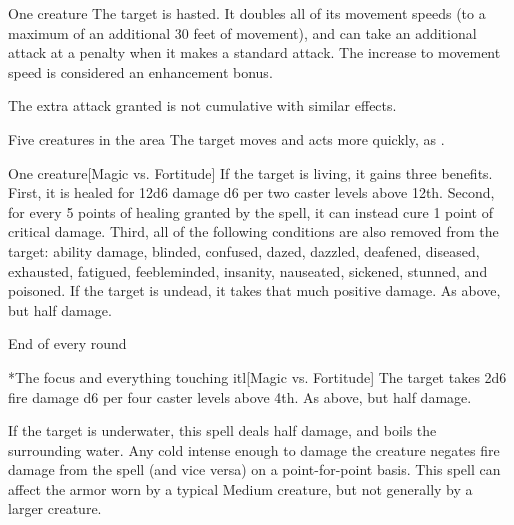 \spelldur{\durshort}
\begin{spelltarget}{One creature}
    \spelleffect The target is hasted. It doubles all of its movement speeds (to a maximum of an additional 30 feet of movement), and can take an additional attack at a  penalty when it makes a standard attack. The increase to movement speed is considered an enhancement bonus.
\end{spelltarget}
\spellnotes The extra attack granted is not cumulative with similar effects.

\begin{spelltargets}{Five creatures in the area}
    \spelleffect The target moves and acts more quickly, as .
\end{spelltargets}

\spellrng{\rngclose}
\begin{spelltarget}{One creature}[Magic vs. Fortitude]
    \spelleffect If the target is living, it gains three benefits. First, it is healed for 12d6 damage \add d6 per two caster levels above 12th. Second, for every 5 points of healing granted by the spell, it can instead cure 1 point of critical damage. Third, all of the following conditions are also removed from the target: ability damage, blinded, confused, dazed, dazzled, deafened, diseased, exhausted, fatigued, feebleminded, insanity, nauseated, sickened, stunned, and poisoned.
    \spellsuccess If the target is undead, it takes that much positive damage.
    \spellfailure As above, but half damage.
\end{spelltarget}

\spellrng{\rngmed}
\spelldur{\durshort \dismissable}
\begin{spelltrigger}{End of every round}
    \begin{spelltargets}*{The focus and everything touching it}l[Magic vs. Fortitude]
        \spellsuccess The target takes 2d6 fire damage \add d6 per four caster levels above 4th.
        \spellfailure As above, but half damage.
    \end{spelltargets}
\end{spelltrigger}
\spellnotes If the target is underwater, this spell deals half damage, and boils the surrounding water. Any cold intense enough to damage the creature negates fire damage from the spell (and vice versa) on a point-for-point basis. This spell can affect the armor worn by a typical Medium creature, but not generally by a larger creature.

